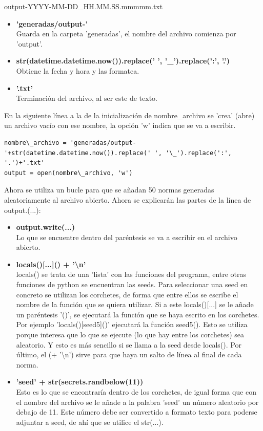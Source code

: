 \documentclass[12pt,twocolumn]{article}
\begin{document}
output-YYYY-MM-DD\_HH.MM.SS.mmmmm.txt\\


\begin{itemize}
\setlength\itemsep{-0.3em}
\item \textbf{'generadas/output-'}\\
 Guarda en la carpeta 'generadas', el nombre del archivo comienza por 'output'.
\item \textbf{str(datetime.datetime.now()).replace(' ', '\_').replace(':', '.')}\\
 Obtiene la fecha y hora y las formatea.
\item \textbf{'.txt'}\\
 Terminación del archivo, al ser este de texto.
\end{itemize}
En la siguiente línea a la de la inicialización de nombre\_archivo se 'crea'
(abre) un archivo vacío con ese nombre, la opción 'w' indica que se va a escribir.
\begin{lstlisting}[texcl=true]
nombre\_archivo = 'generadas/output-'+str(datetime.datetime.now()).replace(' ', '\_').replace(':', '.')+'.txt'
output = open(nombre\_archivo, 'w')
\end{lstlisting}
Ahora se utiliza un bucle para que se añadan 50 normas generadas aleatoriamente
al archivo abierto. Ahora se explicarán las partes de la línea de output.(...):
\begin{itemize}
\setlength\itemsep{-0.3em}
\item \textbf{output.write(...)}\\
Lo que se encuentre dentro del paréntesis se va a escribir en el archivo abierto.

\item \textbf{locals()[...]() + '\textbackslash n'}\\
    locals() se trata de una 'lista' con las funciones del programa, entre otras funciones de python se encuentran las seeds. Para seleccionar una seed en concreto se utilizan los corchetes, de forma que entre ellos se escribe el nombre de la función que se quiera utilizar. Si a este locals()[...] se le añade un paréntesis '()', se ejecutará la función que se haya escrito en los corchetes. Por ejemplo 'locals()[seed5]()' ejecutará la función seed5().  Esto se utiliza porque interesa que lo que se ejecute (lo que hay entre los corchetes) sea aleatorio. Y esto es más sencillo si se llama a la seed desde locals(). Por último, el (+ '\textbackslash n')  sirve para que haya un salto de línea al final de cada norma.

\item \textbf{'seed' + str(secrets.randbelow(11))}\\
     Esto es lo que se encontraría dentro de los corchetes, de igual forma que con el nombre del archivo se le añade a la palabra 'seed' un número aleatorio por debajo de 11. Este número debe ser convertido a formato texto para poderse adjuntar a seed, de ahí que se utilice el str(...).

\end{itemize}
\end{document}
